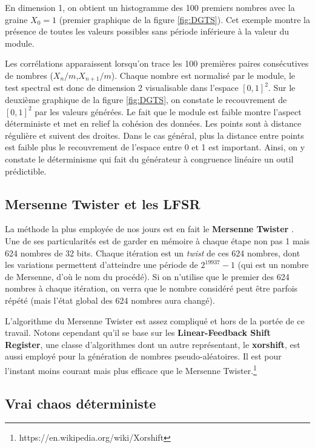 \documentclass{scrartcl}
\begin{document}
  En dimension 1, on obtient un histogramme des 100 premiers nombres avec la graine $X_0 = 1$ (premier graphique de la figure \ref{fig:DGTS}).
  Cet exemple montre la présence de toutes les valeurs possibles sans période inférieure à la valeur du module.\par
Les corrélations apparaissent lorsqu'on trace les 100 premières paires consécutives de nombres ($X_n/m$,$X_{n+1}/m$).
 Chaque nombre est normalisé par le module, le test spectral est donc de dimension 2 visualisable dans l'espace $[0,1]^2$.
 Sur le deuxième graphique de la figure \ref{fig:DGTS}, on constate le recouvrement de $[0,1]^2$ par les valeurs générées. 
 Le fait que le module est faible montre l'aspect déterministe et met en relief la cohésion des données. Les points sont à distance régulière et suivent des droites. 
 Dans le cas général, plus la distance entre points est faible plus le recouvrement de l'espace entre 0 et 1 est important.
Ainsi, on y constate le déterminisme qui fait du générateur à congruence linéaire un outil prédictible.

\subsection{Mersenne Twister et les LFSR}\label{s:MT}
La méthode la plus employée de nos jours est en fait le \textbf{Mersenne
  Twister} \cite{MT}. Une de ses particularités est de garder en mémoire à
chaque étape non pas 1 mais 624 nombres de 32 bits. Chaque itération est un
\textit{twist} de ces 624 nombres, dont les variations permettent d'atteindre
une période de $2^{19937}-1$ (qui est un nombre de Mersenne, d'où le nom du
procédé). Si on n'utilise que le premier des 624 nombres à chaque itération, on
verra que le nombre considéré peut être parfois répété (mais l'état global des
624 nombres aura changé).

L'algorithme du Mersenne Twister est assez compliqué et hors de la portée de ce
travail. Notons cependant qu'il se base sur les  \textbf{Linear-Feedback Shift
  Register}, une classe d'algorithmes dont un autre représentant, le
\textbf{xorshift}, est aussi employé pour la génération de nombres
pseudo-aléatoires. Il est pour l'instant moins courant mais plus efficace que
le Mersenne Twister.\footnote{https://en.wikipedia.org/wiki/Xorshift}

\subsection{Vrai chaos déterministe}
\end{document}
